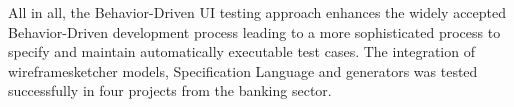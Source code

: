 \documentclass{sig-alternate-05-2015}
\begin{document}
All in all, the Behavior-Driven UI testing approach enhances the widely accepted Behavior-Driven development process leading to a more sophisticated process to specify and maintain automatically executable test cases.
The integration of wireframesketcher models, Specification Language and generators was tested successfully in four projects from the banking sector. 





%



%
%

\end{document}
